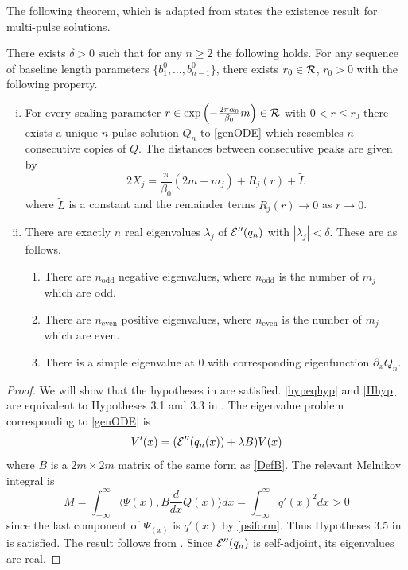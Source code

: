 \documentclass[thesis.tex]{subfiles}
\begin{document}
The following theorem, which is adapted from \cite[Theorem 3.6]{SandstedeStrut} states the existence result for multi-pulse solutions.

\begin{theorem}\label{multipulseexistR}
There exists $\delta > 0$ such that for any $n \geq 2$ the following holds. For any sequence of baseline length parameters $\{ b_1^0, \dots, b_{n-1}^0 \}$, there exists $r_0 \in \mathcal{R}$, $r_0 > 0$ with the following property.
\begin{enumerate}[(i)]
\item For every scaling parameter $r \in \mathop\mathrm{exp}\nolimits\left(-\frac{2 \pi \alpha_0}{\beta_0}m \right) \in \mathcal{R}$ with $0 < r \leq r_0$ there exists a unique $n$-pulse solution $Q_n$ to \cref{genODE} which resembles $n$ consecutive copies of $Q$. The distances between consecutive peaks are given by
\[
2 X_j = \frac{\pi}{\beta_0}(2 m + m_j) + R_j(r) + \tilde{L}
\]
where $\tilde{L}$ is a constant and the remainder terms $R_j(r) \rightarrow 0$ as $r \rightarrow 0$.
\item There are exactly $n$ real eigenvalues $\lambda_j$ of $\mathcal{E}''(q_n)$ with $|\lambda_j| < \delta$. These are as follows.
\begin{enumerate}
	\item There are $n_{\text{odd}}$ negative eigenvalues, where $n_{\text{odd}}$ is the number of $m_j$ which are odd.
	\item There are $n_{\text{even}}$ positive eigenvalues, where $n_{\text{even}}$ is the number of $m_j$ which are even.
	\item There is a simple eigenvalue at 0 with corresponding eigenfunction $\partial_x Q_n$.
\end{enumerate}
\end{enumerate}
\begin{proof}
We will show that the hypotheses in \cite{SandstedeStrut} are satisfied. \cref{hypeqhyp} and \cref{Hhyp} are equivalent to Hypotheses 3.1 and 3.3 in \cite{SandstedeStrut}. The eigenvalue problem corresponding to \cref{genODE} is
\[
V'(x) = (\mathcal{E}''(q_n(x)) + \lambda B )V(x)
\]
where $B$ is a $2m\times 2m$ matrix of the same form as \cref{DefB}. The relevant Melnikov integral is
\[
M = \int_{-\infty}^\infty \langle \Psi(x), B \frac{d}{dx} Q(x) \rangle  dx = \int_{-\infty}^\infty q'(x)^2 dx > 0
\]
since the last component of $\Psi_(x)$ is $q'(x)$ by \cref{psiform}. Thus Hypotheses 3.5 in \cite{SandstedeStrut} is satisfied. The result follows from \cite[Theorem 3.6]{SandstedeStrut}. Since $\mathcal{E}''(q_n)$ is self-adjoint, its eigenvalues are real.
\end{proof}
\end{theorem}
\end{document}
